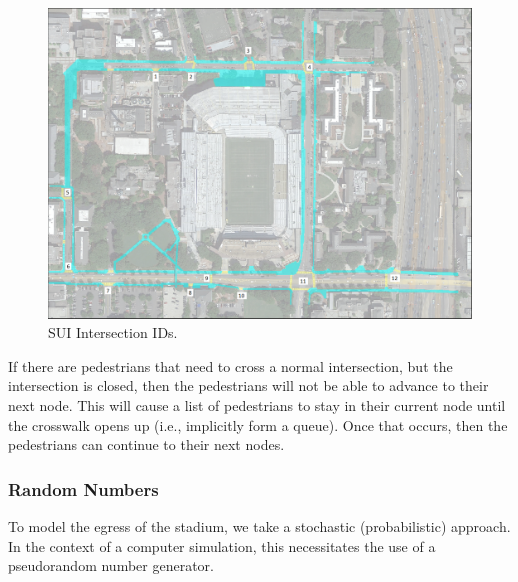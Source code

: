 \documentclass[12pt]{article}
\begin{document}
\begin{figure}[H]
	\includegraphics[width=\linewidth,natwidth=1026,natheight=750]{GATechMap_IntersectionIDs.png}
	\caption{SUI Intersection IDs.}
	\label{fig:intersectionMap}
\end{figure}

\begin{table}[]
	\centering
	\caption{Intersection Open/Close Timesteps}
	\label{table:intersectionTimes}
\end{table}

If there are pedestrians that need to cross a normal intersection, but the
intersection is closed, then the pedestrians will not be able to advance to
their next node. This will cause a list of pedestrians to stay in their
current node until the crosswalk opens up (i.e., implicitly form a queue).
Once that occurs, then the pedestrians can continue to their next nodes.

\subsubsection{Random Numbers}
To model the egress of the stadium, we take a stochastic (probabilistic)
approach. In the context of a computer simulation, this necessitates the use of
a pseudorandom number generator.
\end{document}
